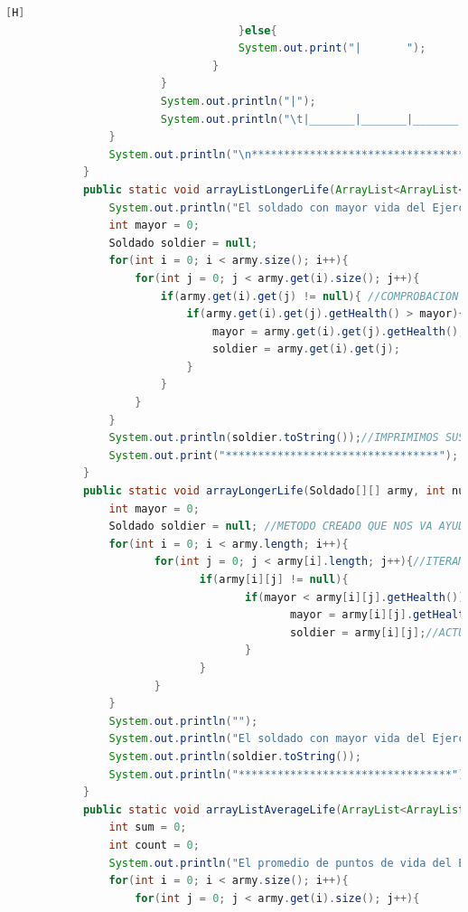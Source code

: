\documentclass{article}
\begin{document}
\begin{lstlisting}[language=java,caption={Las lineas de codigos del metodo creado:}][H]
									}else{
									System.out.print("|       ");
								}
						}
						System.out.println("|");
						System.out.println("\t|_______|_______|_______|_______|_______|_______|_______|_______|_______|_______|");
				}
				System.out.println("\n*********************************");
			}
			public static void arrayListLongerLife(ArrayList<ArrayList<Soldado>> army, int num){
				System.out.println("El soldado con mayor vida del Ejercito " + num + " es: "); //METODO CREADO PARA PODER PERMITIRNOS A CONOCER EL SOLDADO CON MAYOR VIDA DE CADA EJERCITO 
				int mayor = 0;
				Soldado soldier = null;
				for(int i = 0; i < army.size(); i++){
					for(int j = 0; j < army.get(i).size(); j++){
						if(army.get(i).get(j) != null){ //COMPROBACION QUE HACEMOS PARA PODER DECIR QUE EL CASILLERO DONDE ESTAMOS ES UN SOLDADO QUE EXISTE
							if(army.get(i).get(j).getHealth() > mayor){ //COMPARAMOS PUNTOS DE VIDA DE CADA SOLDADO PARA VER QUIEN ES EL MAYOR 
								mayor = army.get(i).get(j).getHealth();
								soldier = army.get(i).get(j);
							}
						}
					}
				}
				System.out.println(soldier.toString());//IMPRIMIMOS SUS DATOS PARA PODER VER DE QUE SOLDADO SE TRATA 
				System.out.print("*********************************");
			}
			public static void arrayLongerLife(Soldado[][] army, int num){
				int mayor = 0;
				Soldado soldier = null; //METODO CREADO QUE NOS VA AYUDAR A DECIRNOS SOBRE LA INFORMACION DEL SOLDADO CON MAYOR VIDAD DEL EJERCITO2 EL CUAL TENDREMOS QUE ITERAR
				for(int i = 0; i < army.length; i++){
					   for(int j = 0; j < army[i].length; j++){//ITERAMOS SOBRE CADA SOLDADO EL CUAL COMPARAÑOS CON SI ESTE ES EL MAYOR EN CUESTION DE VIDA VAMOS PASANDO POR CADA SOLDADO
							  if(army[i][j] != null){
									 if(mayor < army[i][j].getHealth()){
											mayor = army[i][j].getHealth();
											soldier = army[i][j];//ACTUALIZAMOS A ESTE SOLDADO CON EL QUE TIENE MAS VIDA DESPUES LO IMPRIMIMOS PARA VER DE QUE SOLDADO SE TRATA 
									 }
							  }
					   }
				}
				System.out.println("");
				System.out.println("El soldado con mayor vida del Ejercito " + num + " es: ");
				System.out.println(soldier.toString());
				System.out.println("*********************************");
			}
			public static void arrayListAverageLife(ArrayList<ArrayList<Soldado>> army, int num){
				int sum = 0;
				int count = 0;
				System.out.println("El promedio de puntos de vida del Ejercito " + num + " es: "); //METODO CREADO QUE NOS PERMITE DAR A CONOCER EL PROMEDIO DE VIDA DE CADA EJERCITO
				for(int i = 0; i < army.size(); i++){
					for(int j = 0; j < army.get(i).size(); j++){

\end{lstlisting}
\end{document}
